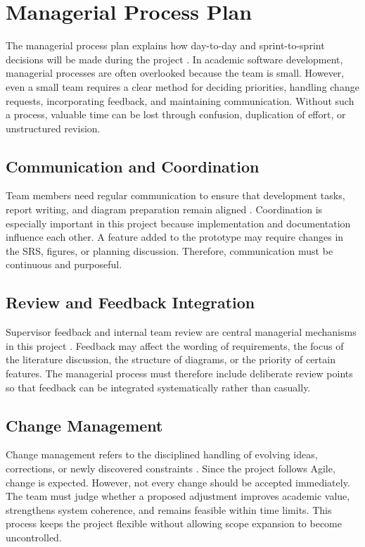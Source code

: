 \section{Managerial Process Plan}

The managerial process plan explains how day-to-day and sprint-to-sprint decisions will be made during the project \cite{spp1}. In academic software development, managerial processes are often overlooked because the team is small. However, even a small team requires a clear method for deciding priorities, handling change requests, incorporating feedback, and maintaining communication. Without such a process, valuable time can be lost through confusion, duplication of effort, or unstructured revision.

\subsection{Communication and Coordination}

Team members need regular communication to ensure that development tasks, report writing, and diagram preparation remain aligned \cite{scrum1}. Coordination is especially important in this project because implementation and documentation influence each other. A feature added to the prototype may require changes in the SRS, figures, or planning discussion. Therefore, communication must be continuous and purposeful.

\subsection{Review and Feedback Integration}

Supervisor feedback and internal team review are central managerial mechanisms in this project \cite{agile1}. Feedback may affect the wording of requirements, the focus of the literature discussion, the structure of diagrams, or the priority of certain features. The managerial process must therefore include deliberate review points so that feedback can be integrated systematically rather than casually.

\subsection{Change Management}

Change management refers to the disciplined handling of evolving ideas, corrections, or newly discovered constraints \cite{agile1}. Since the project follows Agile, change is expected. However, not every change should be accepted immediately. The team must judge whether a proposed adjustment improves academic value, strengthens system coherence, and remains feasible within time limits. This process keeps the project flexible without allowing scope expansion to become uncontrolled.

